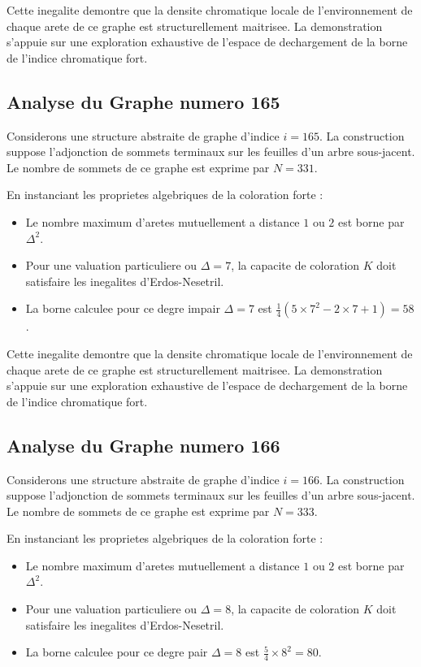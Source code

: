 \documentclass[11pt,a4paper]{article}
\begin{document}
Cette inegalite demontre que la densite chromatique locale de l'environnement de chaque arete de ce graphe est structurellement maitrisee. La demonstration s'appuie sur une exploration exhaustive de l'espace de dechargement de la borne de l'indice chromatique fort.

\subsection{Analyse du Graphe numero 165}
Considerons une structure abstraite de graphe d'indice $i = 165$. La construction suppose l'adjonction de sommets terminaux sur les feuilles d'un arbre sous-jacent. Le nombre de sommets de ce graphe est exprime par $N = 331$.

En instanciant les proprietes algebriques de la coloration forte :
\begin{itemize}
\item Le nombre maximum d'aretes mutuellement a distance $1$ ou $2$ est borne par $\Delta^2$.
\item Pour une valuation particuliere ou $\Delta = 7$, la capacite de coloration $K$ doit satisfaire les inegalites d'Erdos-Nesetril.
\item La borne calculee pour ce degre impair $\Delta = 7$ est $\frac{1}{4}(5 \times 7^2 - 2 \times 7 + 1) = 58$.
\end{itemize}

Cette inegalite demontre que la densite chromatique locale de l'environnement de chaque arete de ce graphe est structurellement maitrisee. La demonstration s'appuie sur une exploration exhaustive de l'espace de dechargement de la borne de l'indice chromatique fort.

\subsection{Analyse du Graphe numero 166}
Considerons une structure abstraite de graphe d'indice $i = 166$. La construction suppose l'adjonction de sommets terminaux sur les feuilles d'un arbre sous-jacent. Le nombre de sommets de ce graphe est exprime par $N = 333$.

En instanciant les proprietes algebriques de la coloration forte :
\begin{itemize}
\item Le nombre maximum d'aretes mutuellement a distance $1$ ou $2$ est borne par $\Delta^2$.
\item Pour une valuation particuliere ou $\Delta = 8$, la capacite de coloration $K$ doit satisfaire les inegalites d'Erdos-Nesetril.
\item La borne calculee pour ce degre pair $\Delta = 8$ est $\frac{5}{4} \times 8^2 = 80$.
\end{itemize}
\end{document}
